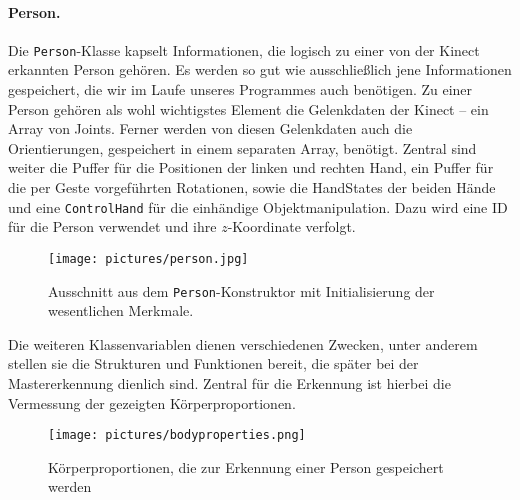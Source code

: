 	\paragraph{Person.} Die \texttt{Person}-Klasse kapselt Informationen, die logisch zu einer von der Kinect erkannten Person gehören. Es werden so gut wie ausschließlich jene Informationen gespeichert, die wir im Laufe unseres Programmes auch benötigen. Zu einer Person gehören als wohl wichtigstes Element die Gelenkdaten der Kinect -- ein Array von Joints. Ferner werden von diesen Gelenkdaten auch die Orientierungen, gespeichert in einem separaten Array, benötigt. Zentral sind weiter die Puffer für die Positionen der linken und rechten Hand, ein Puffer für die per Geste vorgeführten Rotationen, sowie die HandStates der beiden Hände und eine \glqq \texttt{ControlHand}\grqq{} für die einhändige Objektmanipulation. Dazu wird eine ID für die Person verwendet und ihre $z$-Koordinate verfolgt. 
	\begin{figure}[h]
	\centering
	\texttt{[image: pictures/person.jpg]}
	\caption{Ausschnitt aus dem \texttt{Person}-Konstruktor mit Initialisierung der wesentlichen Merkmale.}
	\end{figure}\par\medskip
	
	Die weiteren Klassenvariablen dienen verschiedenen Zwecken, unter anderem stellen sie die Strukturen und Funktionen bereit, die später bei der Mastererkennung dienlich sind. Zentral für die Erkennung ist hierbei die Vermessung der gezeigten Körperproportionen.
	\begin{figure}[h]
	\centering
	\texttt{[image: pictures/bodyproperties.png]}
	\caption{Körperproportionen, die zur Erkennung einer Person gespeichert werden}
	\end{figure}\par\medskip
	
